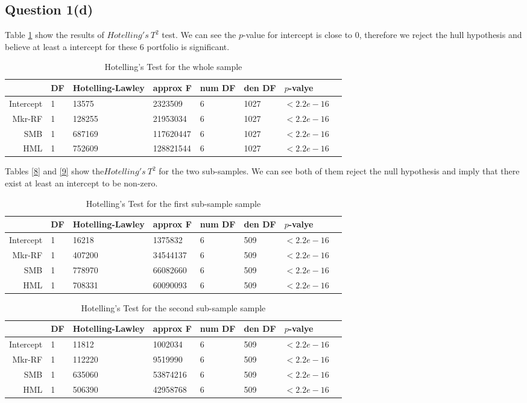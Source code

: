 \documentclass[11pt]{article}
\begin{document}
\subsection{Question 1(d)}
Table \ref{tab7} show the results of $Hotelling's ~T^2$ test. We can see the $p$-value for intercept is close to 0, therefore we reject the hull hypothesis and believe at least a intercept for these 6 portfolio is significant.
\begin{table}[ht]
\centering
\begin{tabular}{rlllllll}
  \hline
&DF&Hotelling-Lawley&approx F & num DF & den DF &$p$-valye\\
\hline
Intercept&1&13575&2323509  &    6  & 1027& $< 2.2e-16$\\
Mkr-RF&1&128255&  21953034&      6&   1027&$ < 2.2e-16$\\
SMB&1&687169 &117620447&      6 &  1027& $< 2.2e-16$ \\
HML&1&752609 &128821544&      6 &  1027&$ < 2.2e-16$\\
   \hline
\end{tabular}
\caption{ Hotelling's Test for the whole sample}\label{tab7}
\end{table}

Tables \ref{8} and \ref{9} show the$ Hotelling's~T^2$ for the two sub-samples. We can see both of them reject the null hypothesis and imply that there exist at least an intercept to be non-zero.

\begin{table}[ht]
\centering
\begin{tabular}{rlllllll}
  \hline
&DF&Hotelling-Lawley&approx F & num DF & den DF &$p$-valye\\
\hline
Intercept&1&16218&  1375832 &     6  &  509& $< 2.2e-16$\\
Mkr-RF&1&407200 &34544137   &   6  &  509&$ < 2.2e-16$\\
SMB&1&778970& 66082660    &  6   & 509& $< 2.2e-16$ \\
HML&1&708331 &60090093&      6 &   509&$ < 2.2e-16$\\
   \hline
\end{tabular}
\caption{ Hotelling's Test for the first sub-sample sample}\label{tab8}
\end{table}

\begin{table}[ht]
\centering
\begin{tabular}{rlllllll}
  \hline
&DF&Hotelling-Lawley&approx F & num DF & den DF &$p$-valye\\
\hline
Intercept&1&11812&  1002034 &     6  &  509& $< 2.2e-16$\\
Mkr-RF&1&112220  &9519990   &   6  &  509&$ < 2.2e-16$\\
SMB&1&635060 &53874216    &  6   & 509& $< 2.2e-16$ \\
HML&1&506390 &42958768&      6 &   509&$ < 2.2e-16$\\
   \hline
\end{tabular}
\caption{ Hotelling's Test for the second sub-sample sample}\label{tab9}
\end{table}
\end{document}
